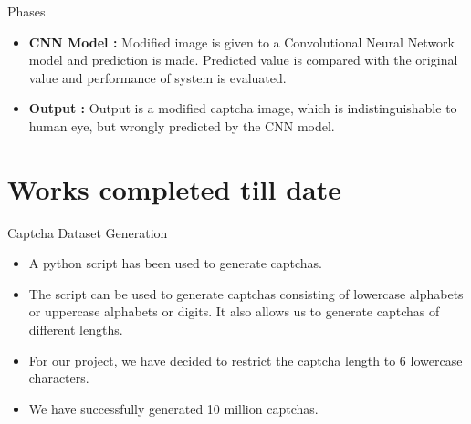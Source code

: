 \documentclass[10pt]{beamer}
\begin{document}
\begin{frame}{Phases}
    \begin{itemize}
    \item \textbf{CNN Model :} Modified image is given to a Convolutional Neural Network model and prediction is made.
Predicted value is compared with the original value and
performance of system is evaluated.
        \item \textbf{Output : }Output is a modified captcha image, which is indistinguishable to
human eye, but wrongly predicted by the CNN model.

    \end{itemize}
\end{frame}

\section{Works completed till date}

\begin{frame}{Captcha Dataset Generation}

\begin{itemize}
\item A python script has been used to generate captchas.
\item The script can be used to generate captchas consisting of lowercase alphabets or uppercase alphabets or digits. It also allows us to generate captchas of different lengths.
\item For our project, we have decided to restrict the captcha length to 6 lowercase characters. 
\item We have successfully generated 10 million captchas.

\end{itemize}
\end{frame} 
 
\end{document}
